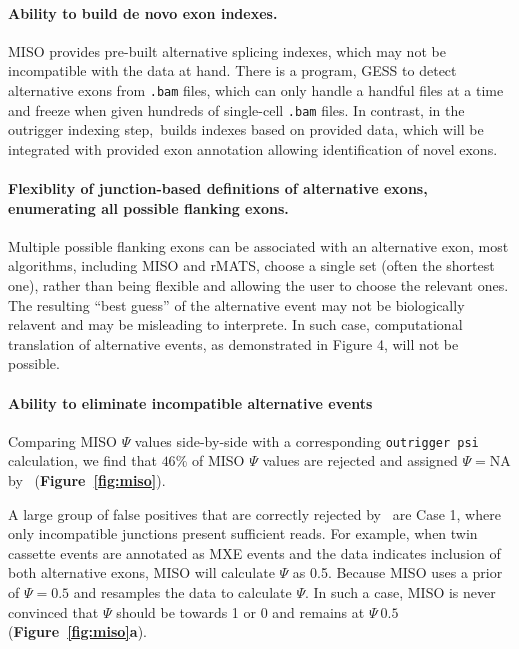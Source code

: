 \paragraph{Ability to build de novo exon indexes.} MISO provides pre-built alternative splicing indexes, which may not be incompatible with the data at hand. There is a program, GESS\cite{Ye:2014cd} to detect alternative exons from \texttt{.bam} files, which can only handle a handful files at a time and freeze when given hundreds of single-cell \texttt{.bam} files. In contrast, in the outrigger indexing step, \outrigger\,builds indexes based on provided data, which will be integrated with provided exon annotation allowing identification of novel exons.

\paragraph{Flexiblity of junction-based definitions of alternative exons, enumerating all possible flanking exons.} Multiple possible flanking exons can be associated with an alternative exon, most algorithms, including MISO and rMATS\cite{Shen:2014gs}, choose a single set (often the shortest one), rather than being flexible and allowing the user to choose the relevant ones. The resulting ``best guess'' of the alternative event may not be biologically relavent and may be misleading to interprete. In such case, computational translation of alternative events, as demonstrated in Figure 4, will not be possible.

\paragraph{Ability to eliminate incompatible alternative events} Comparing MISO $\Psi$ values side-by-side with a corresponding \texttt{outrigger psi} calculation, we find that $46\%$ of MISO $\Psi$ values are rejected and assigned $\Psi = \text{NA}$ by \outrigger\, (\textbf{Figure~\ref{fig:miso}}).

A large group of false positives that are correctly rejected by \outrigger\, are Case 1, where only incompatible junctions present sufficient reads. For example, when twin cassette events are annotated as MXE events and the data indicates inclusion of both alternative exons, MISO will calculate $\Psi$ as 0.5. Because MISO uses a prior of $\Psi=0.5$ and resamples the data to calculate $\Psi$. In such a case, MISO is never convinced that $\Psi$ should be towards 1 or 0 and remains at $\Psi~0.5$ (\textbf{Figure~\ref{fig:miso}a}). %

